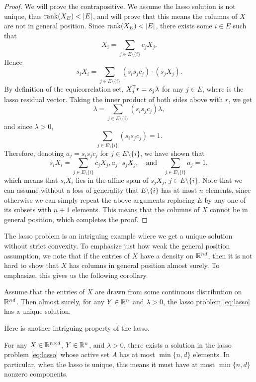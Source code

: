 \documentclass{article}
\begin{document}
\begin{proof}
We will prove the contrapositive. We assume the lasso solution is not unique,
thus $\mathrm{rank}(X_E) < |E|$, and will prove that this means the columns of $X$ are
not in general position. Since $\mathrm{rank}(X_E) < |E|$, there exists some $i \in E$
such that 
\[
X_i = \sum_{j \in E\setminus\{i\}} c_j X_j.
\]
Hence
\[
s_i X_i = \sum_{j \in E\setminus\{i\}} (s_i s_j c_j) \cdot (s_j X_j).
\]
By definition of the equicorrelation set, $X_j^{\mathsf{T}} r = s_j \lambda$ for any $j
\in E$, where  is the lasso residual vector. Taking the
inner  product of both sides above with $r$, we get 
\[
\lambda = \sum_{j \in E\setminus\{i\}} (s_i s_j c_j) \lambda,
\]
and since $\lambda>0$,
\[
\sum_{j \in E\setminus\{i\}} (s_i s_j c_j) = 1.
\]
Therefore, denoting $a_j = s_i s_j c_j$ for $j \in E\setminus\{i\}$, we have
shown that
\[
s_i X_i = \sum_{j \in E\setminus\{i\}} c_j X_j,
a_j \cdot s_j X_j, \quad \text{and} \quad 
\sum_{j \in E\setminus\{i\}} a_j = 1,
\]
which means that $s_iX_i$ lies in the affine span of $s_jX_j$, $j \in
E\setminus\{i\}$. Note that we can assume without a loss of generality that  
$E\setminus\{i\}$ has at most $n$ elements, since otherwise we can simply repeat
the above arguments replacing $E$ by any one of its subsets with $n+1$
elements. This means that the columns of $X$ cannot be in general position,
which completes the proof. 
\end{proof}

The lasso problem is an intriguing example where we get a unique solution
without strict convexity. To emphasize just how weak the general position
assumption, we note that if the entries of $X$ have a density on $\mathbb{R}^{nd}$, then
it is not hard to show that $X$ has columns in general position almost surely.
To emphasize, this gives us the following corollary.      

\begin{corollary}
Assume that the entries of $X$ are drawn from some continuous distribution on
$\mathbb{R}^{nd}$. Then almost surely, for any $Y \in \mathbb{R}^n$ and $\lambda>0$, the lasso
problem \eqref{eq:lasso} has a unique solution.  
\end{corollary} 

Here is another intriguing property of the lasso. 

\begin{proposition}
For any $X \in \mathbb{R}^{n \times d}$, $Y \in \mathbb{R}^n$, and $\lambda>0$, there exists a 
solution in the lasso problem \eqref{eq:lasso} whose active set $A$ has at most 
$\min\{n,d\}$ elements. In particular, when the lasso is unique, this means it
must have at most $\min\{n,d\}$ nonzero components.  
\end{proposition}
\end{document}
